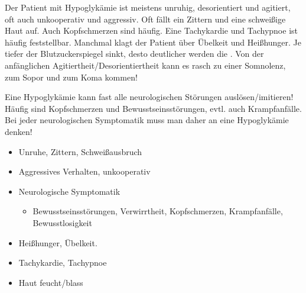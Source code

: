 {%
Der Patient mit Hypoglykämie ist meistens unruhig,
desorientiert und agitiert, oft auch unkooperativ und
aggressiv. Oft fällt ein Zittern und eine schweißige Haut
auf. Auch Kopfschmerzen sind häufig. Eine Tachykardie und
Tachypnoe ist häufig feststellbar. Manchmal klagt der
Patient über Übelkeit und Heißhunger.
Je tiefer der Blutzuckerspiegel sinkt, desto deutlicher
werden die . Von der anfänglichen
Agitiertheit/Desorientiertheit kann es rasch zu einer
Somnolenz, zum Sopor und zum Koma kommen!

Eine Hypoglykämie kann fast alle neurologischen  Störungen
aus\-lösen/imitieren! Häufig sind Kopfschmerzen und
Bewusstseinsstörungen, evtl. auch Krampfanfälle. Bei jeder
neurologischen Symptomatik muss man daher an eine
Hypoglykämie denken!



}{
\begin{itemize}
  \item Unruhe, Zittern, Schweißausbruch
  \item Aggressives Verhalten, unkooperativ
  \item Neurologische Symptomatik
  \begin{itemize}
    \item Bewusstseinsstörungen, Verwirrtheit, Kopfschmerzen, Krampfanfälle,
    Bewusstlosigkeit
  \end{itemize}
  \item Heißhunger, Übelkeit.
  \item Tachykardie, Tachypnoe
  \item Haut feucht/blass
\end{itemize}
}{}{}{}











